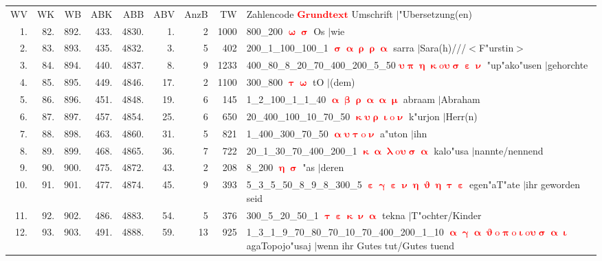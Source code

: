 \documentclass[a4paper,10pt,landscape]{article}
\begin{document}
\begin{tabular}{rrrrrrrrp{120mm}}
WV&WK&WB&ABK&ABB&ABV&AnzB&TW&Zahlencode \textcolor{red}{$\boldsymbol{Grundtext}$} Umschrift $|$"Ubersetzung(en)\\
1.&82.&892.&433.&4830.&1.&2&1000&800\_200 \textcolor{red}{$\boldsymbol{\upomega\upsigma}$} Os $|$wie\\
2.&83.&893.&435.&4832.&3.&5&402&200\_1\_100\_100\_1 \textcolor{red}{$\boldsymbol{\upsigma\upalpha\uprho\uprho\upalpha}$} sarra $|$Sara(h)///$<$F"urstin$>$\\
3.&84.&894.&440.&4837.&8.&9&1233&400\_80\_8\_20\_70\_400\_200\_5\_50 \textcolor{red}{$\boldsymbol{\upsilon\uppi\upeta\upkappa\mathrm{o}\upsilon\upsigma\upepsilon\upnu}$} "up"ako"usen $|$gehorchte\\
4.&85.&895.&449.&4846.&17.&2&1100&300\_800 \textcolor{red}{$\boldsymbol{\uptau\upomega}$} tO $|$(dem)\\
5.&86.&896.&451.&4848.&19.&6&145&1\_2\_100\_1\_1\_40 \textcolor{red}{$\boldsymbol{\upalpha\upbeta\uprho\upalpha\upalpha\upmu}$} abraam $|$Abraham\\
6.&87.&897.&457.&4854.&25.&6&650&20\_400\_100\_10\_70\_50 \textcolor{red}{$\boldsymbol{\upkappa\upsilon\uprho\upiota\mathrm{o}\upnu}$} k"urjon $|$Herr(n)\\
7.&88.&898.&463.&4860.&31.&5&821&1\_400\_300\_70\_50 \textcolor{red}{$\boldsymbol{\upalpha\upsilon\uptau\mathrm{o}\upnu}$} a"uton $|$ihn\\
8.&89.&899.&468.&4865.&36.&7&722&20\_1\_30\_70\_400\_200\_1 \textcolor{red}{$\boldsymbol{\upkappa\upalpha\uplambda\mathrm{o}\upsilon\upsigma\upalpha}$} kalo"usa $|$nannte/nennend\\
9.&90.&900.&475.&4872.&43.&2&208&8\_200 \textcolor{red}{$\boldsymbol{\upeta\upsigma}$} "as $|$deren\\
10.&91.&901.&477.&4874.&45.&9&393&5\_3\_5\_50\_8\_9\_8\_300\_5 \textcolor{red}{$\boldsymbol{\upepsilon\upgamma\upepsilon\upnu\upeta\upvartheta\upeta\uptau\upepsilon}$} egen"aT"ate $|$ihr geworden seid\\
11.&92.&902.&486.&4883.&54.&5&376&300\_5\_20\_50\_1 \textcolor{red}{$\boldsymbol{\uptau\upepsilon\upkappa\upnu\upalpha}$} tekna $|$T"ochter/Kinder\\
12.&93.&903.&491.&4888.&59.&13&925&1\_3\_1\_9\_70\_80\_70\_10\_70\_400\_200\_1\_10 \textcolor{red}{$\boldsymbol{\upalpha\upgamma\upalpha\upvartheta\mathrm{o}\uppi\mathrm{o}\upiota\mathrm{o}\upsilon\upsigma\upalpha\upiota}$} agaTopojo"usaj $|$wenn ihr Gutes tut/Gutes tuend\\

\end{tabular}
\end{document}
